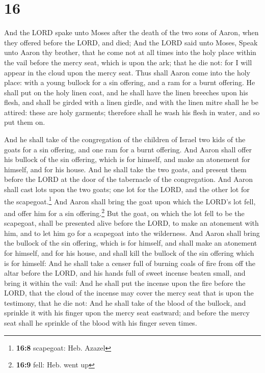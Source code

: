 \hypertarget{section-15}{%
\section{16}\label{section-15}}

 And the LORD spake unto Moses after the death of the two
sons of Aaron, when they offered before the LORD, and died;
 And the LORD said unto Moses, Speak unto Aaron thy
brother, that he come not at all times into the holy place within the
vail before the mercy seat, which is upon the ark; that he die not: for
I will appear in the cloud upon the mercy seat.  Thus
shall Aaron come into the holy place: with a young bullock for a sin
offering, and a ram for a burnt offering.  He shall put on
the holy linen coat, and he shall have the linen breeches upon his
flesh, and shall be girded with a linen girdle, and with the linen mitre
shall he be attired: these are holy garments; therefore shall he wash
his flesh in water, and so put them on.

 And he shall take of the congregation of the children of
Israel two kids of the goats for a sin offering, and one ram for a burnt
offering.  And Aaron shall offer his bullock of the sin
offering, which is for himself, and make an atonement for himself, and
for his house.  And he shall take the two goats, and
present them before the LORD at the door of the tabernacle of the
congregation.  And Aaron shall cast lots upon the two
goats; one lot for the LORD, and the other lot for the
scapegoat.\footnote{\textbf{16:8} scapegoat: Heb. Azazel} 
And Aaron shall bring the goat upon which the LORD's lot fell, and offer
him for a sin offering.\footnote{\textbf{16:9} fell: Heb. went up}
 But the goat, on which the lot fell to be the scapegoat,
shall be presented alive before the LORD, to make an atonement with him,
and to let him go for a scapegoat into the wilderness. 
And Aaron shall bring the bullock of the sin offering, which is for
himself, and shall make an atonement for himself, and for his house, and
shall kill the bullock of the sin offering which is for himself:
 And he shall take a censer full of burning coals of fire
from off the altar before the LORD, and his hands full of sweet incense
beaten small, and bring it within the vail:  And he shall
put the incense upon the fire before the LORD, that the cloud of the
incense may cover the mercy seat that is upon the testimony, that he die
not:  And he shall take of the blood of the bullock, and
sprinkle it with his finger upon the mercy seat eastward; and before the
mercy seat shall he sprinkle of the blood with his finger seven times.

